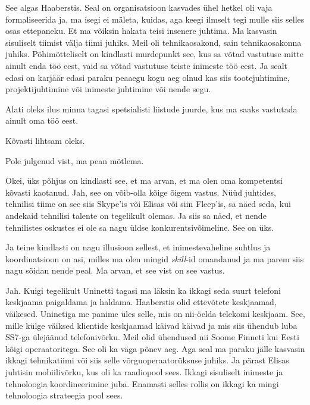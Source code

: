 
See algas Haaberstis. Seal on organisatsioon kasvades ühel hetkel oli vaja formaliseerida ja, ma isegi ei mäleta, kuidas, aga keegi ilmselt tegi mulle siis selles osas ettepaneku. Et ma võiksin hakata teisi insenere juhtima. Ma kasvasin sisuliselt tiimist välja tiimi juhiks. Meil oli tehnikaosakond, sain tehnikaosakonna juhiks. Põhimõtteliselt on kindlasti murdepunkt  see, kus sa võtad vastutuse mitte ainult enda töö eest, vaid sa võtad vastutuse teiste inimeste töö eest. Ja sealt edasi on  karjäär edasi paraku peaaegu kogu aeg olnud kas siis tootejuhtimine, projektijuhtimine või inimeste juhtimine või nende segu. 


Alati oleks ilus minna tagasi spetsialisti liistude juurde, kus ma saaks vastutada ainult oma töö eest. 


Kõvasti lihtsam oleks. 


Pole julgenud vist, ma pean mõtlema. 

Okei, üks põhjus on kindlasti see, et ma arvan, et ma olen oma kompetentsi kõvasti kaotanud. Jah, see on võib-olla kõige õigem vastus. Nüüd juhtides, tehnilisi tiime on see siis Skype'is või Elisas või siin Fleep'is, sa näed seda, kui andekaid tehnilisi talente on tegelikult olemas. Ja siis sa näed, et  nende tehnilistes oskustes ei ole sa nagu üldse konkurentsivõimeline. See on üks.


Ja teine kindlasti on nagu illusioon sellest, et  inimestevaheline suhtlus ja koordinatsioon on asi, milles ma olen mingid \emph{skill}-id omandanud ja ma parem siis nagu sõidan nende peal. Ma arvan, et see vist on see vastus. 


Jah. Kuigi tegelikult Uninetti tagasi ma läksin ka ikkagi seda suurt telefoni keskjaama paigaldama ja haldama. Haaberstis olid  ettevõtete keskjaamad, väikesed. Uninetiga me panime üles selle, mis on nii-öelda telekomi keskjaam. See, mille külge  väiksed klientide keskjaamad käivad käivad ja mis siis ühendub luba SS7-ga ülejäänud telefonivõrku. Meil olid ühendused nii Soome Finneti  kui Eesti kõigi operaatoritega. See oli ka väga põnev aeg. Aga seal ma paraku jälle kasvasin  ikkagi tehnikatiimi või siis selle võrguoperaatorüksuse juhiks. Ja pärast Elisas juhtisin mobiilivõrku, kus oli ka raadiopool sees. Ikkagi sisuliselt inimeste ja tehnoloogia koordineerimine juba. Enamasti selles rollis on ikkagi ka mingi tehnoloogia strateegia pool sees. 

